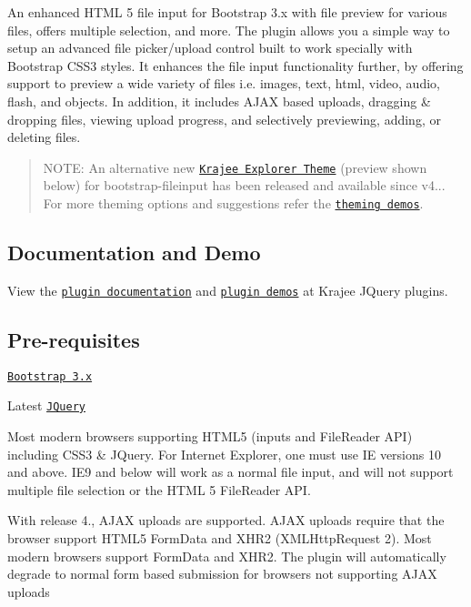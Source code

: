 \href{http://badge.fury.io/bo/bootstrap-fileinput}{\tt } \href{https://packagist.org/packages/kartik-v/bootstrap-fileinput}{\tt } \href{https://packagist.org/packages/kartik-v/bootstrap-fileinput}{\tt } \href{https://packagist.org/packages/kartik-v/bootstrap-fileinput}{\tt } \href{https://packagist.org/packages/kartik-v/bootstrap-fileinput}{\tt }

An enhanced H\+T\+ML 5 file input for Bootstrap 3.\+x with file preview for various files, offers multiple selection, and more. The plugin allows you a simple way to setup an advanced file picker/upload control built to work specially with Bootstrap C\+S\+S3 styles. It enhances the file input functionality further, by offering support to preview a wide variety of files i.\+e. images, text, html, video, audio, flash, and objects. In addition, it includes A\+J\+AX based uploads, dragging \& dropping files, viewing upload progress, and selectively previewing, adding, or deleting files.



\begin{quote}
N\+O\+TE\+: An alternative new \href{http://plugins.krajee.com/file-krajee-explorer-demo}{\tt Krajee Explorer Theme} (preview shown below) for {\ttfamily bootstrap-\/fileinput} has been released and available since v4... For more theming options and suggestions refer the \href{http://plugins.krajee.com/file-theme-demo}{\tt theming demos}. \end{quote}




\subsection*{Documentation and Demo}

View the \href{http://plugins.krajee.com/file-input}{\tt plugin documentation} and \href{http://plugins.krajee.com/file-input/demo}{\tt plugin demos} at Krajee J\+Query plugins.

\subsection*{Pre-\/requisites}


\begin{DoxyEnumerate}
\item \href{http://getbootstrap.com/}{\tt Bootstrap 3.\+x}
\item Latest \href{http://jquery.com/}{\tt J\+Query}
\item Most modern browsers supporting H\+T\+M\+L5 (inputs and File\+Reader A\+PI) including C\+S\+S3 \& J\+Query. For Internet Explorer, one must use IE versions 10 and above. I\+E9 and below will work as a normal file input, and will not support multiple file selection or the H\+T\+ML 5 File\+Reader A\+PI.
\item With release 4., A\+J\+AX uploads are supported. A\+J\+AX uploads require that the browser support H\+T\+M\+L5 Form\+Data and X\+H\+R2 (X\+M\+L\+Http\+Request 2). Most modern browsers support Form\+Data and X\+H\+R2. The plugin will automatically degrade to normal form based submission for browsers not supporting A\+J\+AX uploads
\end{DoxyEnumerate}

